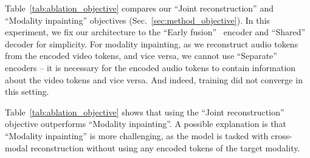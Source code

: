 \documentclass[10pt,twocolumn,letterpaper]{article}
\begin{document}
\begin{table}[t]
\vspace{-0.25\baselineskip}
\caption{Ablation study of different pretraining objectives.
Models are pre-trained for 400 epochs on VGGSound with the ``Early fusion'' encoder, and ``Shared'' decoder architecture.
}
\vspace{-0.6\baselineskip}
\vspace{-1.5\baselineskip}
\label{tab:ablation_objective}
\end{table}
 


Table~\ref{tab:ablation_objective} compares our ``Joint reconstruction'' and ``Modality inpainting'' objectives (Sec.~\ref{sec:method_objective}).
In this experiment, we fix our architecture to the 
``Early fusion''  encoder and ``Shared'' decoder for simplicity. For modality inpainting, as we reconstruct audio tokens from the encoded video tokens, and vice versa, we cannot use ``Separate'' encoders -- it is necessary for the encoded audio tokens to contain information about the video tokens and vice versa.
And indeed, training did not converge in this setting. 

Table~\ref{tab:ablation_objective} shows that using the ``Joint reconstruction'' objective outperforms ``Modality inpainting''.
A possible explanation is that ``Modality inpainting'' is more challenging, as the model is tasked with cross-modal reconstruction without using any encoded tokens of the target modality.
\end{document}
